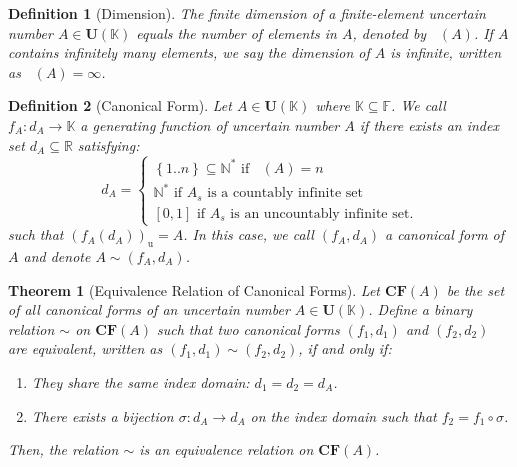 \documentclass[a4paper,12pt,twoside]{memoir}
\newtheorem{definition}{Definition}[chapter]
\newtheorem{theorem}{Theorem}[chapter]
\DeclareMathOperator{\dimU}{\dim_U}
\newcommand{\set}[1]{\left\{#1\right\}} %
\newcommand{\bd}[1]{\left(#1\right)_\mathrm{u}} %
\newcommand{\tsbd}[1]{\mathbf{U}(\mathbb{#1})}
\begin{document}
	\begin{definition}[Dimension]
		The finite dimension of a finite-element uncertain number $A \in \tsbd{K}$ equals the number of elements in $A$, denoted by $\dimU(A)$. If $A$ contains infinitely many elements, we say the dimension of $A$ is infinite, written as $\dimU(A) = \infty$.
	\end{definition}
	
	\begin{definition}[Canonical Form]
		Let $A \in \tsbd{K}$ where $\mathbb{K} \subseteq \mathbb{F}$. We call $f_A : d_A \to \mathbb{K}$ a generating function of uncertain number $A$ if there exists an index set $d_A \subseteq \mathbb{R}$ satisfying:
		\[d_A = \begin{cases*}
			\set{1..n} \subseteq \mathbb{N^*} \text{ if } \dimU(A)=n           \\
			\mathbb{N^*} \text{ if } A_s \text{ is a countably infinite set  } \\
			[0,1] \text{ if } A_s \text{ is an uncountably infinite set.}
		\end{cases*}\]
		such that $\bd{f_A(d_A)}= A$. In this case, we call $(f_A,d_A)$ a canonical form of $A$ and denote $A \sim (f_A,d_A)$.
	\end{definition}
	
	\begin{theorem}[Equivalence Relation of Canonical Forms]
		\label{thm:canonical_form_equivalence}
		Let $\mathbf{CF}(A)$ be the set of all canonical forms of an uncertain number $A \in \tsbd{K}$. Define a binary relation $\sim$ on $\mathbf{CF}(A)$ such that two canonical forms $(f_1, d_1)$ and $(f_2, d_2)$ are equivalent, written as $(f_1, d_1) \sim (f_2, d_2)$, if and only if:
		\begin{enumerate}[leftmargin=*]
			\item They share the same index domain: $d_1 = d_2 = d_A$.
			\item There exists a bijection $\sigma : d_A \to d_A$ on the index domain such that $f_2 = f_1 \circ \sigma$.
		\end{enumerate}
		Then, the relation $\sim$ is an equivalence relation on $\mathbf{CF}(A)$.
	\end{theorem}
	
\end{document}
